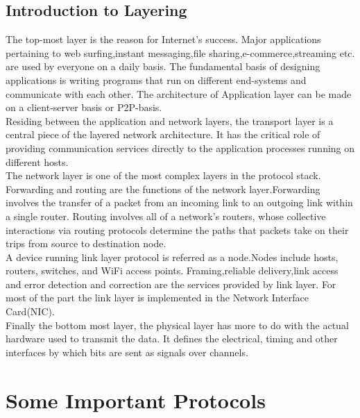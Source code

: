 \documentclass{article}
\begin{document}
\subsection{Introduction to Layering}
The top-most layer is the reason for Internet's success. Major applications pertaining to web surfing,instant messaging,file sharing,e-commerce,streaming etc. are used by everyone on a daily basis. The fundamental basis of designing applications is writing programs that run on different end-systems and communicate with each other. The architecture of Application layer can be made on a client-server basis or P2P-basis.\\
Residing between the application and network layers, the transport layer is a central piece of the layered network architecture. It has the critical role of providing communication services directly to the application processes running on different hosts.\\
The network layer is one of the most complex layers in the protocol stack. Forwarding and routing are the functions of the network layer.Forwarding involves the transfer of a packet from an incoming link to an outgoing link within a single router. Routing involves all of a network’s routers, whose collective interactions via routing protocols determine the paths that packets take on their trips from source to destination node.\\
A device running link layer protocol is referred as a node.Nodes include hosts, routers, switches, and WiFi access points. Framing,reliable delivery,link access and error detection and correction are the services provided by link layer. For most of the part the link layer is implemented in the Network Interface Card(NIC).\\
Finally the bottom most layer, the physical layer has more to do with the actual hardware used to transmit the data. It defines the electrical, timing and other interfaces by which bits are sent as signals over channels.

\section{Some Important Protocols}
\end{document}
